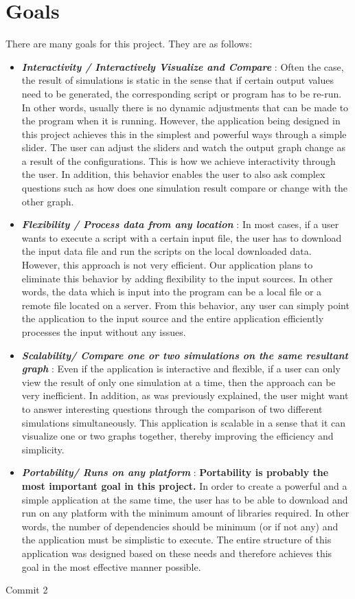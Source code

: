 \section*{Goals}

There are many goals for this project. They are as follows:

\begin{itemize}
    \item \textbf{\textit{Interactivity / Interactively Visualize and Compare} }: Often the case, the result of simulations is static in the sense that if certain output values need to be generated, the corresponding script or program has to be re-run. In other words, usually there is no dynamic adjustments that can be made to the program when it is running. However, the application being designed in this project achieves this in the simplest and powerful ways through a simple slider. The user can adjust the sliders and watch the output graph change as a result of the configurations. This is how we achieve interactivity through the user. In addition, this behavior enables the user to also ask complex questions such as how does one simulation result compare or change with the other graph.
    
    \item \textbf{\textit{Flexibility / Process data from any location} }: In most cases, if a user wants to execute a script with a certain input file, the user has to download the input data file and run the scripts on the local downloaded data. However, this approach is not very efficient. Our application plans to eliminate this behavior by adding flexibility to the input sources. In other words, the data which is input into the program can be a local file or a remote file located on a server. From this behavior, any user can simply point the application to the input source and the entire application efficiently processes the input without any issues. 
    
    \item \textbf{\textit{Scalability/ Compare one or two simulations on the same resultant graph} }: Even if the application is interactive and flexible, if a user can only view the result of only one simulation at a time, then the approach can be very inefficient. In addition, as was previously explained, the user might want to answer interesting questions through the comparison of two different simulations simultaneously. This application is scalable in a sense that it can visualize one or two graphs together, thereby improving the efficiency and simplicity. 
    
    \item \textbf{\textit{Portability/ Runs on any platform} }: \textbf{Portability is probably the most important goal in this project.} In order to create a powerful and a simple application at the same time, the user has to be able to download and run on any platform with the minimum amount of libraries required. In other words, the number of dependencies should be minimum (or if not any) and the application must be simplistic to execute. The entire structure of this application was designed based on these needs and therefore achieves this goal in the most effective manner possible.   
\end{itemize}


Commit 2
